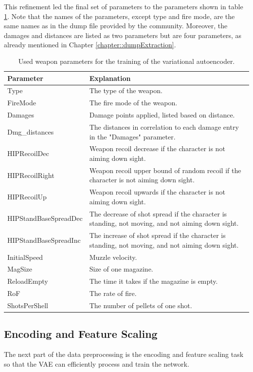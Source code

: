 \documentclass[MGS,Master,english]{twbook}%
\begin{document}
This refinement led the final set of parameters to the parameters shown in table \ref{table::bf1::usedParams}. Note that the names of the parameters, except type and fire mode, are the same names as in the dump file provided by the  community. Moreover, the damages and distances are listed as two parameters but are four parameters, as already mentioned in Chapter \ref{chapter::dumpExtraction}.
\begin{table}[!ht]
	\centering
	\begin{tabular}{|l|p{10.8cm}|}
		\hline
		\textbf{Parameter} & \textbf{Explanation} \\ \hline
		Type & The type of the weapon. \\ \hline
		FireMode & The fire mode of the weapon. \\ \hline
		Damages & Damage points applied, listed based on distance. \\ \hline
		Dmg\_distances & The distances in correlation to each damage entry in the "Damages" parameter. \\ \hline
		HIPRecoilDec & Weapon recoil decrease if the character is not aiming down sight. \\ \hline
		HIPRecoilRight & Weapon recoil upper bound of random recoil if the character is not aiming down sight. \\ \hline
		HIPRecoilUp & Weapon recoil upwards if the character is not aiming down sight. \\ \hline
		HIPStandBaseSpreadDec & The decrease of shot spread if the character is standing, not moving, and not aiming down sight. \\ \hline
		HIPStandBaseSpreadInc & The increase of shot spread if the character is standing, not moving, and not aiming down sight. \\ \hline
		InitialSpeed & Muzzle velocity. \\ \hline
		MagSize & Size of one magazine. \\ \hline
		ReloadEmpty & The time it takes if the magazine is empty. \\ \hline
		RoF & The rate of fire. \\ \hline
		ShotsPerShell & The number of pellets of one shot. \\ \hline
	\end{tabular}
	\caption{Used weapon parameters for the training of the variational autoencoder.}
	\label{table::bf1::usedParams}
\end{table}

\subsection{Encoding and Feature Scaling}
The next part of the data preprocessing is the encoding and feature scaling task so that the VAE can efficiently process and train the network. 
\end{document}
